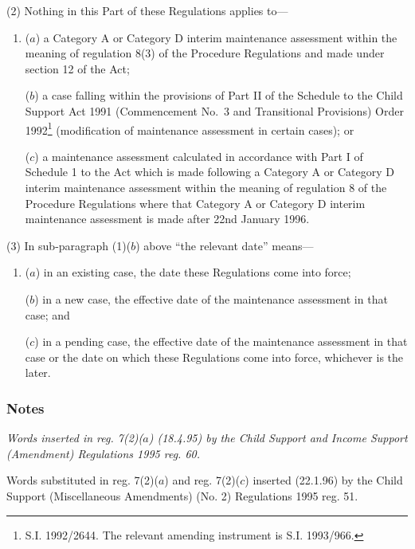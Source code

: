 \documentclass[a4paper]{article}
\newcommand\amendment[1]{\subsubsection*{Notes}{\itshape\frenchspacing\footnotesize #1 \par}}
\begin{document}
(2) Nothing in this Part of these Regulations applies to—
\begin{enumerate}\item[]
($a$) a Category A 
or Category D  %
interim maintenance assessment within the meaning of 
regulation 8(3)  %
of the Procedure Regulations
and made under section 12 of the Act; 

($b$) a case falling within the provisions of Part II of the Schedule to the Child Support Act 1991 (Commencement No.\ 3 and Transitional Provisions) Order 1992\footnote{\frenchspacing S.I. 1992/2644. The relevant amending instrument is S.I. 1993/966.} (modification of maintenance assessment in certain cases);
or %

($c$) a maintenance assessment calculated in accordance with Part I of Schedule 1 to the Act which is made following a Category A or Category D interim maintenance assessment within the meaning of regulation 8 of the Procedure Regulations where that Category A or Category D interim maintenance assessment is made after 22nd January 1996.
\end{enumerate}

(3) In sub-paragraph (1)($b$) above “the relevant date” means—
\begin{enumerate}\item[]
($a$) in an existing case, the date these Regulations come into force;

($b$) in a new case, the effective date of the maintenance assessment in that case; and

($c$) in a pending case, the effective date of the maintenance assessment in that case or the date on which these Regulations come into force, whichever is the later.
\end{enumerate}

\amendment{
Words inserted in reg. 7(2)($a$) (18.4.95) by the Child Support and Income Support (Amendment) Regulations 1995 reg. 60.

Words substituted in reg. 7(2)($a$) and reg. 7(2)($c$) inserted (22.1.96) by the Child Support (Miscellaneous Amendments) (No. 2) Regulations 1995 reg. 51.
}
\end{document}
